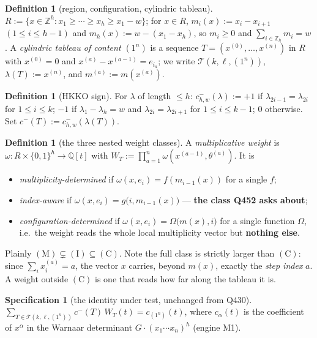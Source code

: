 \documentclass[11pt]{article}
\theoremstyle{plain}
\theoremstyle{definition}
\newtheorem{definition}[theorem]{Definition}
\newtheorem{specification}[theorem]{Specification}
\theoremstyle{remark}
\newcommand{\Zh}{\mathbb{Z}_h}
\newcommand{\cm}{c^{-}}
\begin{document}
\begin{definition}[region, configuration, cylindric tableau]
$R:=\{x\in\mathbb{Z}^h: x_1\ge\cdots\ge x_h\ge x_1-w\}$; for $x\in R$,
$m_i(x):=x_i-x_{i+1}$ $(1\le i\le h-1)$ and $m_h(x):=w-(x_1-x_h)$, so $m_i\ge0$ and
$\sum_{i\in\Zh}m_i=w$. A \emph{cylindric tableau of content $(1^n)$} is a sequence
$T=(x^{(0)},\dots,x^{(n)})$ in $R$ with $x^{(0)}=0$ and $x^{(a)}-x^{(a-1)}=e_{i_a}$; we write
$\mathcal T(k,\ell,(1^n))$, $\lambda(T):=x^{(n)}$, and $m^{(a)}:=m(x^{(a)})$.
\end{definition}

\begin{definition}[HKKO sign]
For $\lambda$ of length $\le h$: $\cm_{h,w}(\lambda):=+1$ if $\lambda_{2i-1}=\lambda_{2i}$ for
$1\le i\le k$; $-1$ if $\lambda_1-\lambda_h=w$ and $\lambda_{2i}=\lambda_{2i+1}$ for
$1\le i\le k-1$; $0$ otherwise. Set $\cm(T):=\cm_{h,w}(\lambda(T))$.
\end{definition}

\begin{definition}[the three nested weight classes]\label{def:classes}
A \emph{multiplicative weight} is $\omega:R\times\{0,1\}^h\to\mathbb{Q}[t]$ with
$W_T:=\prod_{a=1}^n\omega(x^{(a-1)},\theta^{(a)})$. It is
\begin{itemize}
\item[(M)] \emph{multiplicity-determined} if $\omega(x,e_i)=f(m_{i-1}(x))$ for a single $f$;
\item[(I)] \emph{index-aware} if $\omega(x,e_i)=g\bigl(i,m_{i-1}(x)\bigr)$ --- \textbf{the class Q452 asks about};
\item[(C)] \emph{configuration-determined} if $\omega(x,e_i)=\Omega\bigl(m(x),i\bigr)$ for a
single function $\Omega$, i.e.\ the weight reads the whole local multiplicity vector but
\textbf{nothing else}.
\end{itemize}
Plainly $(\mathrm M)\subsetneq(\mathrm I)\subseteq(\mathrm C)$. Note the full class is strictly
larger than $(\mathrm C)$: since $\sum_i x^{(a)}_i=a$, the vector $x$ carries, beyond $m(x)$,
exactly the \emph{step index} $a$. A weight outside $(\mathrm C)$ is one that reads how far
along the tableau it is.
\end{definition}

\begin{specification}[the identity under test, unchanged from Q430]\label{spec}
$\displaystyle\sum_{T\in\mathcal T(k,\ell,(1^n))}\cm(T)\,W_T(t)=c_{(1^n)}(t)$, where
$c_\alpha(t)$ is the coefficient of $x^\alpha$ in the Warnaar determinant
$G\cdot(x_1\cdots x_n)^h$ (engine M1).
\end{specification}
\end{document}
